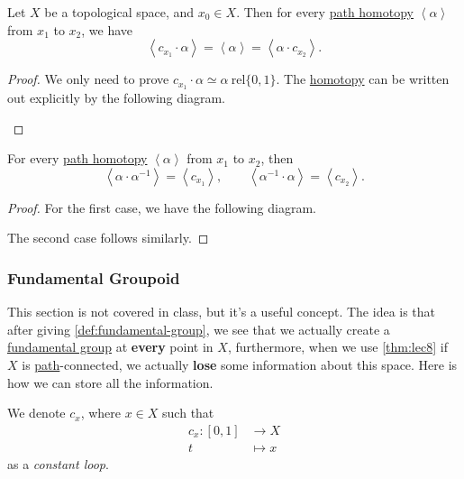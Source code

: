 \begin{lemma}\label{lma:lec8-3}
	Let \(X\) be a topological space, and \(x_0\in X\). Then for every \hyperref[def:homotopy-path]{path homotopy} \(\left< \alpha  \right> \) from
	\(x_1\) to \(x_2\), we have
	\[
		\left< c_{x_1}\cdot \alpha  \right> = \left< \alpha  \right> = \left< \alpha \cdot c_{x_2} \right>.
	\]
\end{lemma}
\begin{proof}
	We only need to prove \(c_{x_1}\cdot \alpha \simeq \alpha\ \mathrm{rel} \{0,1\} \). The \hyperref[def:homotopy]{homotopy} can be written out explicitly by the following diagram.
	\begin{figure}[H]
		\centering
		\label{fig:pf:lma:lec8-3}
	\end{figure}
\end{proof}

\begin{lemma}\label{lma:lec8-4}
	For every \hyperref[def:homotopy-path]{path homotopy} \(\left< \alpha  \right> \) from \(x_1\) to \(x_2\), then
	\[
		\left< \alpha \cdot \alpha ^{-1}  \right> = \left< c_{x_1} \right>, \qquad \left< \alpha ^{-1} \cdot \alpha  \right> = \left< c_{x_2} \right>.
	\]
\end{lemma}
\begin{proof}
	For the first case, we have the following diagram.
	\begin{figure}[H]
		\centering
		\label{fig:pf:lma:lec8-4}
	\end{figure}
	The second case follows similarly.
\end{proof}

\subsubsection{Fundamental Groupoid}
This section is not covered in class, but it's a useful concept. The idea is that after giving \autoref{def:fundamental-group}, we see that we actually create a \hyperref[def:fundamental-group]{fundamental group}
at \textbf{every} point in \(X\), furthermore, when we use \autoref{thm:lec8} if \(X\) is \hyperref[def:path]{path}-connected, we actually \textbf{lose} some
information about this space. Here is how we can store all the information.

\begin{notation}\label{not:constant-loop}
	We denote \(c_x\), where \(x\in X\) such that
	\[
		\begin{split}
			c_{x}\colon [0, 1]&\to X\\
			t&\mapsto x
		\end{split}
	\]
	as a \emph{constant loop}.
\end{notation}

